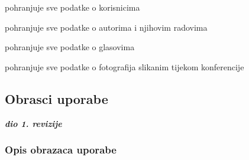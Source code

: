 \begin{packed_enum}
\begin{packed_enum}
				\end{packed_enum}
					
				\item  {}
					
					\begin{packed_enum}
						
						\item pohranjuje sve podatke o korisnicima
						\item pohranjuje sve podatke o autorima i njihovim radovima
						\item pohranjuje sve podatke o glasovima
						\item pohranjuje sve podatke o fotografija slikanim tijekom konferencije
						
					\end{packed_enum}
				
			\end{packed_enum}
			
			\eject 
			
			
				
			\subsection{Obrasci uporabe}
				
				\textbf{\textit{dio 1. revizije}}
				
				\subsubsection{Opis obrazaca uporabe}
				
